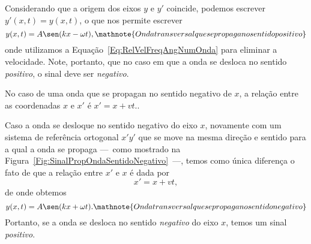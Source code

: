 Considerando que a origem dos eixos $y$ e $y'$ coincide, podemos escrever $y'(x,t) = y(x,t)$, o que nos permite escrever
\begin{equation}
    y(x,t) = A\sen(kx - \omega t), \mathnote{Onda transversal que se propaga no sentido positivo}
\end{equation}
%
onde utilizamos a Equação~\ref{Eq:RelVelFreqAngNumOnda} para eliminar a velocidade. Note, portanto, que no caso em que a onda se desloca no sentido \emph{positivo}, o sinal deve ser \emph{negativo}.

\begin{marginfigure}[3cm]
\centering
{}
\caption{No caso de uma onda que se propagan no sentido negativo de $x$, a relação entre as coordenadas $x$ e $x'$ é $x' = x + vt$.\label{Fig:SinalPropOndaSentidoNegativo}.}
\end{marginfigure}

Caso a onda se desloque no sentido negativo do eixo $x$, novamente com um sistema de referência ortogonal $x'y'$ que se move na mesma direção e sentido para a qual a onda se propaga ---~como mostrado na Figura~\ref{Fig:SinalPropOndaSentidoNegativo}~---, temos como única diferença o fato de que a relação entre $x'$ e $x$ é dada por
\begin{equation}
    x' = x + vt,
\end{equation}
%
de onde obtemos
\begin{equation}
    y(x,t) = A\sen(kx + \omega t). \mathnote{Onda transversal que se propaga no sentido negativo}
\end{equation}
%
Portanto, se a onda se desloca no sentido \emph{negativo} do eixo $x$, temos um sinal \emph{positivo}.

